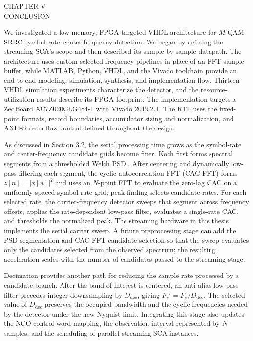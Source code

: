 \newpage
{}

\begin{center}
  \vspace*{1.65in}
  CHAPTER V\\
  CONCLUSION   
\end{center}

\bigskip
We investigated a low-memory, FPGA-targeted VHDL architecture for $M$-QAM-SRRC symbol-rate--center-frequency detection.  We began by defining the streaming SCA's scope and then described its sample-by-sample datapath.  The architecture uses custom selected-frequency pipelines in place of an FFT sample buffer, while MATLAB, Python, VHDL, and the Vivado toolchain provide an end-to-end modeling, simulation, synthesis, and implementation flow.  Thirteen VHDL simulation experiments characterize the detector, and the resource-utilization results describe its FPGA footprint.  The implementation targets a ZedBoard XC7Z020CLG484-1 with Vivado 2019.2.1.  The RTL uses the fixed-point formats, record boundaries, accumulator sizing and normalization, and AXI4-Stream flow control defined throughout the design.

As discussed in Section 3.2, the serial processing time grows as the symbol-rate and center-frequency candidate grids become finer.  Koch first forms spectral segments from a thresholded Welch PSD \cite{koch-19}.  After centering and dynamically low-pass filtering each segment, the cyclic-autocorrelation FFT (CAC-FFT) forms $z[n]=|x[n]|^2$ and uses an $N$-point FFT to evaluate the zero-lag CAC on a uniformly spaced symbol-rate grid; peak finding selects candidate rates.  For each selected rate, the carrier-frequency detector sweeps that segment across frequency offsets, applies the rate-dependent low-pass filter, evaluates a single-rate CAC, and thresholds the normalized peak.  The streaming hardware in this thesis implements the serial carrier sweep.  A future preprocessing stage can add the PSD segmentation and CAC-FFT candidate selection so that the sweep evaluates only the candidates selected from the observed spectrum; the resulting acceleration scales with the number of candidates passed to the streaming stage.

Decimation provides another path for reducing the sample rate processed by a candidate branch.  After the band of interest is centered, an anti-alias low-pass filter precedes integer downsampling by $D_{\mathrm{dec}}$, giving $F_s'=F_s/D_{\mathrm{dec}}$.  The selected value of $D_{\mathrm{dec}}$ preserves the occupied bandwidth and the cyclic frequencies needed by the detector under the new Nyquist limit.  Integrating this stage also updates the NCO control-word mapping, the observation interval represented by $N$ samples, and the scheduling of parallel streaming-SCA instances.

